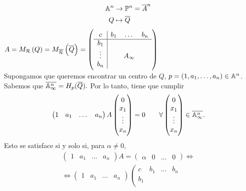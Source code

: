 \begin{obs}
  \begin{align*}
    \mathbb{A}^n &\to \mathbb{P}^n = \overline{A}^n \\
    Q &\mapsto \overline{Q}
  \end{align*}
  $A = M_{\mathcal{R}} \left( Q \right) = M_{\overline{\mathcal{R}}} \left( \overline{Q} \right) =
  \left(\begin{array}{c|ccc}
    c & b_1 & \dots & b_n \\
    \hline
    b_1 & & & \\
    \vdots & & A_\infty & \\
    b_n & & &
  \end{array}\right)$ \\
  Supongamos que queremos encontrar un centro de $Q$, $p = 
  \left( 1, a_1, \dots, a_n \right)\in \mathbb{A}^n$. Sabemos que $\overline{\mathbb{A}^n_\infty} = 
  H_p(\overline{Q}).$ Por lo tanto, tiene que cumplir
  \[\begin{pmatrix}
      1 & a_1 & \dots & a_n 
    \end{pmatrix}
    A
    \begin{pmatrix}
      0 \\ x_1 \\ \vdots \\ x_n 
    \end{pmatrix}
    = 0 \qquad \forall
    \begin{pmatrix} 0 \\ x_1 \\ \vdots \\ x_n \end{pmatrix} \in \overline{\mathbb{A}^n_\infty}.
  \]
  Esto se satisface si y solo si, para $\alpha \neq 0$,
  \begin{gather*}
    \begin{pmatrix}
      1 & a_1 & \dots & a_n 
    \end{pmatrix}
    A = 
    \begin{pmatrix} 
      \alpha & 0 & \dots & 0 
    \end{pmatrix} 
    \iff \\
    \iff
    \begin{pmatrix}
      1 & a_1 & \dots & a_n 
    \end{pmatrix}
    \left(\begin{array}{c|ccc}
      c & b_1 & \dots & b_n \\
      \hline
      b_1 & & & \\

\end{array}
\end{gather*}
\end{obs}
